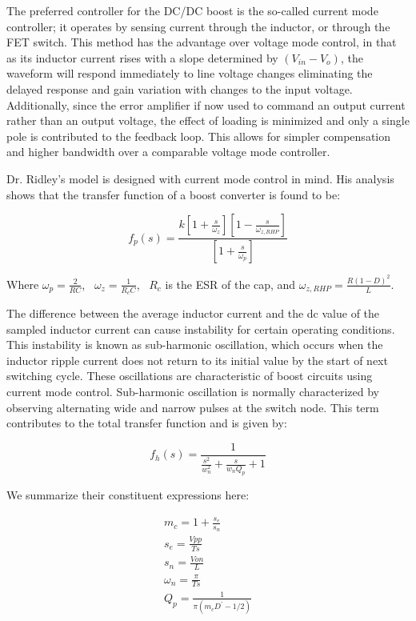 The preferred controller for the DC/DC boost is the so-called current mode controller; it operates by sensing current through the inductor, or through the FET switch. This method has the advantage over voltage mode control, in that as its inductor current rises with a slope determined by $(V_{in}-V_o)$, the waveform will respond immediately to line voltage changes eliminating the delayed response and gain variation with changes to the input voltage. Additionally, since the error amplifier if now used to command an output current rather than an output voltage, the effect of loading is minimized and only a single pole is contributed to the feedback loop. This allows for simpler compensation and higher bandwidth over a comparable voltage mode controller. 

Dr. Ridley's model is designed with current mode control in mind. His analysis shows that the transfer function of a boost converter is found to be:

\begin{equation}
f_p(s)=\frac{k[1 + \frac{s}{\omega_z}][1 - \frac{s}{\omega_{z,RHP}}]}{[1 + \frac{s}{\omega_p}]}
\end{equation}

Where $\omega_p = \frac{2}{RC}$, ~$\omega_z = \frac{1}{R_cC}$, ~$R_c$ is the ESR of the cap, and $\omega_{z,RHP} = \frac{R(1-D)^2}{L}$.

The difference between the average inductor current and the dc value of the sampled inductor current can cause instability for certain operating conditions. This instability is known as sub-harmonic oscillation, which occurs when the inductor ripple current does not return to its initial value by the start of next switching cycle. These oscillations are characteristic of boost circuits using current mode control. Sub-harmonic oscillation is normally characterized by observing alternating wide and narrow pulses at the switch node. This term contributes to the total transfer function and is given by:

\begin{equation}
f_h(s)=\frac{1}{\frac{s^2}{w_n^2} + \frac{s}{w_nQ_p} + 1}
\end{equation}

We summarize their constituent expressions here:

\begin{gather*}
m_c = 1 + \frac{s_e}{s_n} \\
s_e = \frac{Vpp}{Ts} \\
s_n = \frac{Von}{L} \\
\omega_n = \frac{\pi}{Ts}\\
Q_p = \frac{1}{\pi(m_cD^{'}-1/2)}
\end{gather*}

